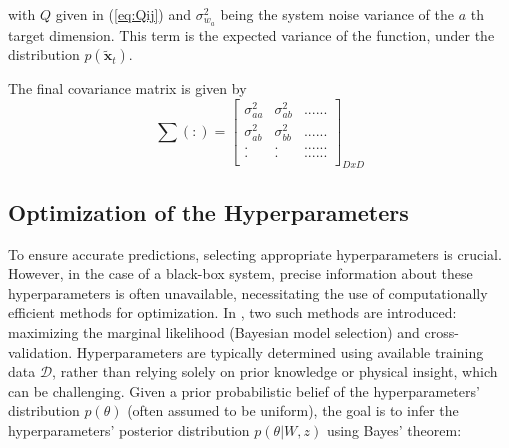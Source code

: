 with $Q$ given in (\ref{eq:Qij}) and $\sigma_{w_a}^2$ being the system noise variance of the $a$ th target dimension. This term is the expected variance of the function, under the distribution $p\left(\tilde{\boldsymbol{x}}_t\right)$.

The final covariance matrix is given by 
\begin{equation}
    \sum (:) = 	\begin{bmatrix}
                        \sigma_{a a}^2 & \sigma_{a b}^2 &......\\
                        \sigma_{a b}^2 & \sigma_{b b}^2 &......\\
                        .&.& ......\\
                        .&.& ......\\
                        \end{bmatrix}_{DxD}
\end{equation}


\subsection{Optimization of the Hyperparameters}\label{sec:optimize_hy}

To ensure accurate predictions, selecting appropriate hyperparameters is crucial. However, in the case of a black-box system, precise information about these hyperparameters is often unavailable, necessitating the use of computationally efficient methods for optimization. In \cite{williams2006gaussian}, two such methods are introduced: maximizing the marginal likelihood (Bayesian model selection) and cross-validation. Hyperparameters are typically determined using available training data \( \mathcal{D} \), rather than relying solely on prior knowledge or physical insight, which can be challenging. Given a prior probabilistic belief of the hyperparameters' distribution \( p(\theta) \) (often assumed to be uniform), the goal is to infer the hyperparameters' posterior distribution \( p(\theta|W,z) \) using Bayes' theorem:


